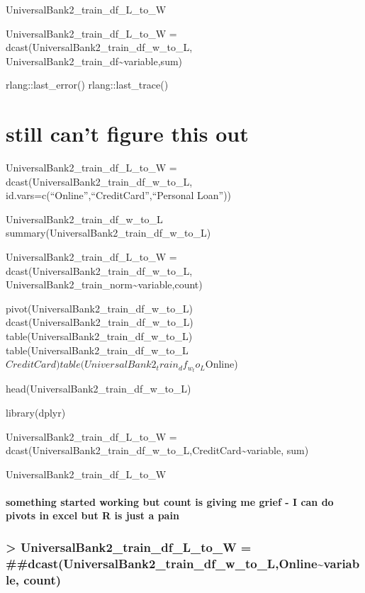 \documentclass[
]{article}
\begin{document}
UniversalBank2\_train\_df\_L\_to\_W

UniversalBank2\_train\_df\_L\_to\_W =
dcast(UniversalBank2\_train\_df\_w\_to\_L,
UniversalBank2\_train\_df\textasciitilde variable,sum)

rlang::last\_error() rlang::last\_trace()

\hypertarget{still-cant-figure-this-out}{%
\section{still can't figure this out}\label{still-cant-figure-this-out}}

UniversalBank2\_train\_df\_L\_to\_W =
dcast(UniversalBank2\_train\_df\_w\_to\_L,
id.vars=c(``Online'',``CreditCard'',``Personal Loan''))

UniversalBank2\_train\_df\_w\_to\_L
summary(UniversalBank2\_train\_df\_w\_to\_L)

UniversalBank2\_train\_df\_L\_to\_W =
dcast(UniversalBank2\_train\_df\_w\_to\_L,
UniversalBank2\_train\_norm\textasciitilde variable,count)

pivot(UniversalBank2\_train\_df\_w\_to\_L)
dcast(UniversalBank2\_train\_df\_w\_to\_L)
table(UniversalBank2\_train\_df\_w\_to\_L)
table(UniversalBank2\_train\_df\_w\_to\_L\(CreditCard) table(UniversalBank2_train_df_w_to_L\)Online)

head(UniversalBank2\_train\_df\_w\_to\_L)

library(dplyr)

UniversalBank2\_train\_df\_L\_to\_W =
dcast(UniversalBank2\_train\_df\_w\_to\_L,CreditCard\textasciitilde variable,
sum)

UniversalBank2\_train\_df\_L\_to\_W

\hypertarget{something-started-working-but-count-is-giving-me-grief---i-can-do-pivots-in-excel-but-r-is-just-a-pain}{%
\paragraph{something started working but count is giving me grief - I
can do pivots in excel but R is just a
pain}\label{something-started-working-but-count-is-giving-me-grief---i-can-do-pivots-in-excel-but-r-is-just-a-pain}}

\hypertarget{universalbank2_train_df_l_to_w-dcastuniversalbank2_train_df_w_to_lonlinevariable-count}{%
\subsubsection{\textgreater{} UniversalBank2\_train\_df\_L\_to\_W =
\#\#dcast(UniversalBank2\_train\_df\_w\_to\_L,Online\textasciitilde variable,
count)}\label{universalbank2_train_df_l_to_w-dcastuniversalbank2_train_df_w_to_lonlinevariable-count}}
\end{document}
